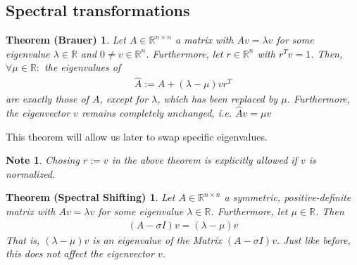 \documentclass[10pt, a4paper, twocolumn]{article} %
\begin{document}
\subsection{Spectral transformations}

\newtheorem{Brauer}[]{Theorem (Brauer)}[section]
\begin{Brauer}
	Let $A \in \mathbb{R}^{n \times n}$ a matrix with $Av=\lambda v$ for some eigenvalue $\lambda \in \mathbb{R}$ and $0 \neq v \in \mathbb{R}^n$.
	Furthermore, let $r \in \mathbb{R}^n$ with $r^{T}v=1$. Then, $\forall \mu \in \mathbb{R}:$ the eigenvalues of
	\begin{align}
		\hat{A} := A + (\lambda - \mu)vr^T
	\end{align}
	are exactly those of $A$, except for $\lambda$, which has been replaced by $\mu$. Furthermore, the eigenvector $v$ remains
	completely unchanged, i.e. $\hat{A}v = \mu v$
\end{Brauer}
This theorem will allow us later to swap specific eigenvalues.

\newtheorem{Brauer Param Note}[]{Note}[section]
\begin{Brauer Param Note}
Chosing $r:=v$ in the above theorem is explicitly allowed if $v$ is normalized.
\end{Brauer Param Note}

\newtheorem{Spectral Shifting}[]{Theorem (Spectral Shifting)}[section]
\begin{Spectral Shifting}
	Let $A \in \mathbb{R}^{n \times n}$ a symmetric, positive-definite matrix with $Av=\lambda v$ for some eigenvalue $\lambda \in \mathbb{R}$.
	Furthermore, let $\mu \in \mathbb{R}$. Then
	\begin{align}
		(A - \sigma I)v = (\lambda - \mu)v
	\end{align}
That is, $(\lambda - \mu)v$ is an eigenvalue of the Matrix $(A - \sigma I)v$. Just like before, this does not affect the
eigenvector $v$.
\end{Spectral Shifting}
\end{document}
